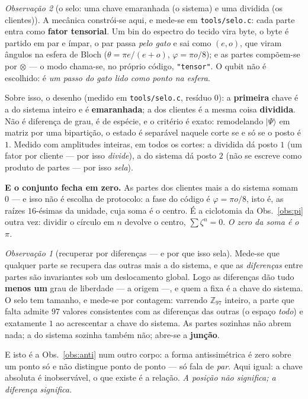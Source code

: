 \documentclass[11pt]{article}
\newcommand{\code}[1]{\texttt{\small #1}}
\newcommand{\Z}{\mathbb Z}
\theoremstyle{plain}
\theoremstyle{remark}
\newtheorem{obs}{Observação}
\begin{document}
\begin{obs}[o selo: uma chave emaranhada (o sistema) e uma dividida (os clientes)]\label{obs:selo}
A mecânica constrói-se aqui, e mede-se em \code{tools/selo.c}: cada parte
entra como \textbf{fator tensorial}. Um bin do espectro do tecido vira byte, o byte é partido em par
e ímpar, o par passa \emph{pelo gato} e sai como $(e,o)$, que viram ângulos na esfera de Bloch
($\theta=\pi e/(e+o)$, $\varphi=\pi o/8$); e as partes compõem-se por $\otimes$ --- o modo chama-se,
no próprio código, \code{"tensor"}. O qubit não é escolhido: é \emph{um passo do gato lido como
ponto na esfera}.

Sobre isso, o desenho (medido em \code{tools/selo.c}, resíduo $0$): a \textbf{primeira} chave é a do
sistema inteiro e é \textbf{emaranhada}; a dos clientes é a mesma coisa \textbf{dividida}. Não é
diferença de grau, é de espécie, e o critério é exato: remodelando $|\Psi\rangle$ em matriz por uma
bipartição, o estado é separável naquele corte se e só se o posto é $1$. Medido com amplitudes
inteiras, em todos os cortes: a dividida dá posto $1$ (um fator por cliente --- por isso
\emph{divide}), a do sistema dá posto $2$ (não se escreve como produto de partes --- por isso
\emph{sela}).

\textbf{E o conjunto fecha em zero.} As partes dos clientes mais a do sistema somam $0$ --- e isso
não é escolha de protocolo: a fase do código é $\varphi=\pi o/8$, isto é, as raízes $16$-ésimas da
unidade, cuja soma é o centro. É a ciclotomia da Obs.~\ref{obs:pi} outra vez: dividir o círculo em
$n$ devolve o centro, $\sum\zeta^n=0$. \emph{O zero da soma é o $\pi$.}

\begin{obs}[recuperar por diferenças --- e por que isso sela]
Mede-se que qualquer parte se recupera das outras mais a do sistema, e que as \emph{diferenças} entre
partes são invariantes sob um deslocamento global. Logo as diferenças dão tudo \textbf{menos um} grau
de liberdade --- a origem ---, e quem a fixa é a chave do sistema. O selo tem tamanho, e mede-se por
contagem: varrendo $\Z_{97}$ inteiro, a parte que falta admite $97$ valores consistentes com as
diferenças das outras (o espaço \emph{todo}) e exatamente $1$ ao acrescentar a chave do sistema.
As partes sozinhas não abrem nada; a do sistema sozinha também não; abre-se a \textbf{junção}.

E isto é a Obs.~\ref{obs:anti} num outro corpo: a forma antissimétrica é zero sobre um ponto só e não
distingue ponto de ponto --- só fala de \emph{par}. Aqui igual: a chave absoluta é inobservável, o
que existe é a relação. \emph{A posição não significa; a diferença significa.}
\end{obs}
\end{obs}
\end{document}
